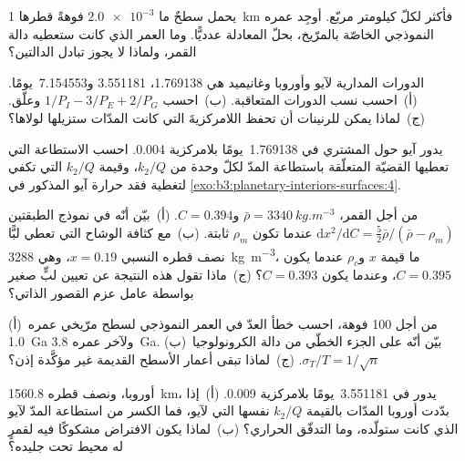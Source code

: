 \begin{exercise}[$\star\star$]\label{exo:b3:planetary-interiors-surfaces:7}
يحمل سطحٌ ما $\num{2.0e-3}$ فوهةً قطرها \qty{1}{km} فأكثر لكلّ
كيلومتر مربّع. أوجِد عمره النموذجي  الخاصّة بالمرّيخ،
بحلّ المعادلة عدديًّا. وما العمر الذي كانت ستعطيه دالة القمر،
ولماذا لا يجوز تبادل الدالتين؟
\end{exercise}

\begin{exercise}[$\star\star$]\label{exo:b3:planetary-interiors-surfaces:8}
الدورات المدارية لآيو وأوروبا وغانيميد هي 1.769138، 3.551181
و\num{7.154553}~يومًا. (أ)~احسب نسب الدورات المتعاقبة.
(ب)~احسب $1/P_I - 3/P_E + 2/P_G$ وعلّق. (ج)~لماذا يمكن للرنينات
أن تحفظ اللامركزيةَ التي كانت المدّات ستزيلها لولاها؟
\end{exercise}

\begin{exercise}[$\star\star$]\label{exo:b3:planetary-interiors-surfaces:9}
يدور آيو حول المشتري في \num{1.769138}~يومًا بلامركزية 0.004.
احسب الاستطاعة التي تعطيها القضيّة المتعلّقة باستطاعة المدّ لكلّ وحدة من $k_2/Q$،
وقيمة $k_2/Q$ التي تكفي لتغطية فقد حرارة آيو
المذكور في \cref{exo:b3:planetary-interiors-surfaces:4}.
\end{exercise}

\begin{exercise}[$\star\star\star$]\label{exo:b3:planetary-interiors-surfaces:10}
من أجل القمر، $\bar\rho = \qty{3340}{kg.m^{-3}}$ و$C = 0.394$.
(أ)~بيّن أنّه في نموذج الطبقتين $\mathrm dx^2/\mathrm dC =
\tfrac52\bar\rho/(\bar\rho - \rho_m)$ عندما تكون $\rho_m$ ثابتة. (ب)~مع
كثافة الوشاح التي تعطي لبًّا نصف قطره النسبي $x = 0.19$، وهي \qty{3288}{kg.m^{-3}}،
ما قيمة $x$ و$\rho_c$ عندما يكون $C = 0.395$، وعندما يكون $C = 0.393$؟
(ج)~ماذا تقول هذه النتيجة عن تعيين لبٍّ صغير بواسطة
عامل عزم القصور الذاتي؟
\end{exercise}

\begin{exercise}[$\star\star\star$]\label{exo:b3:planetary-interiors-surfaces:11}
(أ)~من أجل 100 فوهة، احسب خطأ العدّ في العمر النموذجي لسطح
مرّيخي عمره \qty{1.0}{Ga} ولآخر عمره \qty{3.8}{Ga}.
(ب)~بيّن أنّه على الجزء الخطّي من دالة الكرونولوجيا $\sigma_T/T =
1/\sqrt n$. (ج)~لماذا تبقى أعمار الأسطح القديمة غير مؤكَّدة إذن؟
\end{exercise}

\begin{exercise}[$\star\star\star$]\label{exo:b3:planetary-interiors-surfaces:12}
أوروبا، ونصف قطره \qty{1560.8}{km}، يدور في \num{3.551181}~يومًا بلامركزية
0.009. (أ)~إذا بدّدت أوروبا المدّات بالقيمة $k_2/Q$ نفسها التي لآيو،
فما الكسر من استطاعة المدّ لآيو الذي كانت ستولّده، وما التدفّق الحراري؟
(ب)~لماذا يكون الافتراض مشكوكًا فيه لقمرٍ له محيط تحت جليده؟
\end{exercise}

